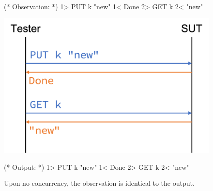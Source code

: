 \begin{figure}
  \centering
  \begin{minipage}[c]{.3\textwidth}
\begin{coq}
  (* Observation: *)
  1> PUT k "new"
  1< Done
  2> GET k
  2< "new"
\end{coq}
  \end{minipage}\begin{minipage}[c]{.4\textwidth}
  \includegraphics[width=\linewidth]{figures/linear-trace}
  \end{minipage}\begin{minipage}[c]{.3\textwidth}
\begin{coq}
  (* Output: *)
  1> PUT k "new"
  1< Done
  2> GET k
  2< "new"
\end{coq}
  \end{minipage}
  \caption[Linear trace upon no concurrency.]{Upon no concurrency, the
    observation is identical to the output.}
  \label{fig:linear-trace}
\end{figure}
